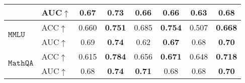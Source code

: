 \begin{table} [t]
{{\begin{tabular}{crcrcrcr|crcr|crcr}
        
         \multicolumn{2}{l}{}&\multicolumn{2}{l}{AUC$\uparrow$} & \multicolumn{2}{c}{0.67} & 
        \multicolumn{2}{c}{\textbf{0.73}}& 
        \multicolumn{2}{c}{\textbf{0.66}}  &\multicolumn{2}{c}{\textbf{0.66}} & 
        \multicolumn{2}{c}{0.63}& 
        \multicolumn{2}{c}{\textbf{0.68}} \\
         \midrule
         \multicolumn{2}{l}{\multirow{2}{*}{$\mathtt{MMLU}$}} &
        \multicolumn{2}{l}{ACC$\uparrow$} & 
        \multicolumn{2}{c}{0.660} & 
        \multicolumn{2}{c}{\textbf{0.751}}& 
        \multicolumn{2}{c}{0.685} &\multicolumn{2}{c}{\textbf{0.754}} & 
        \multicolumn{2}{c}{0.507}& 
        \multicolumn{2}{c}{\textbf{0.668}} \\
       
       
        
         \multicolumn{2}{l}{}&\multicolumn{2}{l}{AUC$\uparrow$} & \multicolumn{2}{c}{0.69} & 
        \multicolumn{2}{c}{\textbf{0.74}}& 
        \multicolumn{2}{c}{0.62} &\multicolumn{2}{c}{\textbf{0.67}} & 
        \multicolumn{2}{c}{0.68}& 
        \multicolumn{2}{c}{\textbf{0.70}}  \\
         \midrule
         \multicolumn{2}{l}{\multirow{2}{*}{$\mathtt{MathQA}$}} &
        \multicolumn{2}{l}{ACC$\uparrow$} & 
        \multicolumn{2}{c}{0.615} & 
        \multicolumn{2}{c}{\textbf{0.784}}& 
        \multicolumn{2}{c}{0.656} &\multicolumn{2}{c}{\textbf{0.671}} & 
        \multicolumn{2}{c}{0.648}& 
        \multicolumn{2}{c}{\textbf{0.718}} \\
       
        
         \multicolumn{2}{l}{}&\multicolumn{2}{l}{AUC$\uparrow$} & \multicolumn{2}{c}{0.68} & 
        \multicolumn{2}{c}{\textbf{0.74}}& 
        \multicolumn{2}{c}{\textbf{0.71}}&\multicolumn{2}{c}{0.68} & 
        \multicolumn{2}{c}{0.68}& 
        \multicolumn{2}{c}{\textbf{0.70}} \\
        

\end{tabular}}}
\end{table}
